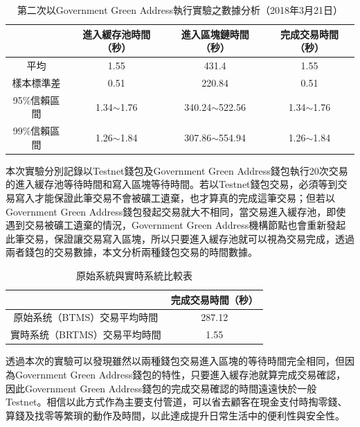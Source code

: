 			\begin{table}[!htbp]
				\centering
				\caption{第二次以Government Green Address執行實驗之數據分析（2018年3月21日）}
				\label{2green-1}
				\begin{tabular}{|c|c|c|c|}
				\hline
				         & 進入緩存池時間（秒）     & 進入區塊鏈時間（秒）         & 完成交易時間（秒）      \\ \hline
				平均       & 1.55           & 431.4              & 1.55           \\ \hline
				樣本標準差    & 0.51           & 220.84             & 0.51           \\ \hline
				95\%信賴區間 & 1.34$\sim$1.76 & 340.24$\sim$522.56 & 1.34$\sim$1.76 \\ \hline
				99\%信賴區間 & 1.26$\sim$1.84 & 307.86$\sim$554.94 & 1.26$\sim$1.84 \\ \hline
				\end{tabular}
				\end{table}

				

				
				



	本次實驗分別記錄以Testnet錢包及Government Green Address錢包執行20次交易的進入緩存池等待時間和寫入區塊等待時間。若以Testnet錢包交易，必須等到交易寫入才能保證此筆交易不會被礦工遺棄，也才算真的完成這筆交易；但若以Government Green Address錢包發起交易就大不相同，當交易進入緩存池，即使遇到交易被礦工遺棄的情況，Government Green Address機構節點也會重新發起此筆交易，保證讓交易寫入區塊，所以只要進入緩存池就可以視為交易完成，透過兩者錢包的交易數據，本文分析兩種錢包交易的時間數據。

	\begin{table}[!htbp]
	\centering
	\caption{原始系統與實時系統比較表}
	\label{generalvsga}
	\begin{tabular}{|c|c|}
	\hline
	 & 完成交易時間（秒） \\ \hline
	原始系统（BTMS）交易平均時間 & 287.12 \\ \hline
	實時系统（BRTMS）交易平均時間 & 1.55 \\ \hline
	\end{tabular}
	\end{table}

	透過本次的實驗可以發現雖然以兩種錢包交易進入區塊的等待時間完全相同，但因為Government Green Address錢包的特性，只要進入緩存池就算完成交易確認，因此Government Green Address錢包的完成交易確認的時間遠遠快於一般Testnet。相信以此⽅式作為主要⽀付管道，可以省去顧客在現金⽀付時掏零錢、算錢及找零等繁瑣的動作及時間，以此達成提升⽇常⽣活中的便利性與安全性。



		